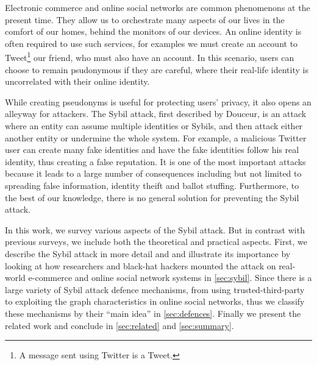 Electronic commerce and online social networks are common phenomenons at the
present time. They allow us to orchestrate many aspects of our lives in the
comfort of our homes, behind the monitors of our devices. An online identity is
often required to use such services, for examples we must create an account to
Tweet\footnote{A message sent using Twitter is a Tweet.} our friend, who must
also have an account. In this scenario, users can choose to remain psudonymous
if they are careful, where their real-life identity is uncorrelated with their
online identity. %

While creating pseudonyms is useful for protecting users' privacy, it also opens
an alleyway for attackers. The Sybil attack, first described by
Douceur\cite{douceur2002sybil}, is an attack where an entity can assume multiple
identities or Sybils, and then attack either another entity or undermine the
whole system. For example, a malicious Twitter user can create many fake
identities and have the fake identities follow his real identity, thus creating
a false reputation. It is one of the most important attacks because it leads to
a large number of consequences including but not limited to spreading false
information, identity theift\cite{bilge2009all} and ballot
stuffing\cite{bhattacharjee2005avoiding}. Furthermore, to the best of our
knowledge, there is no general solution for preventing the Sybil attack.

In this work, we survey various aspects of the Sybil attack. But in contrast
with previous surveys, we include both the theoretical and practical aspects.
First, we describe the Sybil attack in more detail and and illustrate its
importance by looking at how researchers and black-hat hackers mounted the
attack on real-world e-commerce and online social network systems in
\autoref{sec:sybil}. Since there is a large variety of Sybil attack defence
mechanisms, from using trusted-third-party to exploiting the graph
characteristics in online social networks, thus we classify these mechanisms by
their ``main idea'' in \autoref{sec:defences}. Finally we present the related
work and conclude in \autoref{sec:related} and \autoref{sec:summary}.

